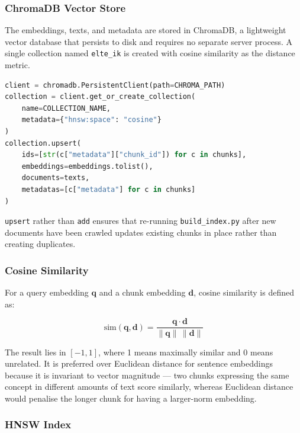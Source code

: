 \subsubsection{ChromaDB Vector Store}

The embeddings, texts, and metadata are stored in ChromaDB, a lightweight
vector database that persists to disk and requires no separate server process.
A single collection named \texttt{elte\_ik} is created with cosine similarity
as the distance metric.

\begin{lstlisting}[language=Python]
client = chromadb.PersistentClient(path=CHROMA_PATH)
collection = client.get_or_create_collection(
    name=COLLECTION_NAME,
    metadata={"hnsw:space": "cosine"}
)
collection.upsert(
    ids=[str(c["metadata"]["chunk_id"]) for c in chunks],
    embeddings=embeddings.tolist(),
    documents=texts,
    metadatas=[c["metadata"] for c in chunks]
)
\end{lstlisting}

\texttt{upsert} rather than \texttt{add} ensures that re-running
\texttt{build\_index.py} after new documents have been crawled updates
existing chunks in place rather than creating duplicates.

\subsubsection*{Cosine Similarity}

For a query embedding $\mathbf{q}$ and a chunk embedding $\mathbf{d}$, cosine
similarity is defined as:

\begin{equation}
\text{sim}(\mathbf{q}, \mathbf{d}) =
    \frac{\mathbf{q} \cdot \mathbf{d}}{\|\mathbf{q}\|\,\|\mathbf{d}\|}
\label{eq:cosine}
\end{equation}

The result lies in $[-1, 1]$, where 1 means maximally similar and 0 means
unrelated. It is preferred over Euclidean distance for sentence embeddings
because it is invariant to vector magnitude — two chunks expressing the same
concept in different amounts of text score similarly, whereas Euclidean
distance would penalise the longer chunk for having a larger-norm embedding.

\subsubsection*{HNSW Index}

